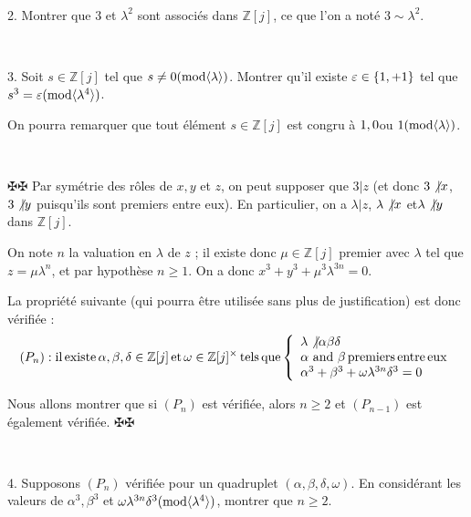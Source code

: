 \

2. Montrer que $3$ et $\lambda^2$ sont associ{\'e}s dans $\mathbb{Z}[j]$, ce
que l'on a not{\'e} $3 \sim \lambda^2$.

\

3. Soit $s \in \mathbb{Z}[j]$ tel que $s \neq 0 (\tmop{mod} \langle \lambda
\rangle)$. Montrer qu'il existe $\varepsilon \in \{\nonconverted{minus} 1, +
1\}$ tel que $s^3 = \varepsilon (\tmop{mod} \langle \lambda^4 \rangle)$.

{} On pourra remarquer que tout
{\'e}l{\'e}ment $s \in \mathbb{Z}[j]$ est congru {\`a} $\nonconverted{minus}
1, 0$ou $1 (\tmop{mod} \langle \lambda \rangle)$.

\

$\maltese \maltese$ Par sym{\'e}trie des r{\^o}les de $x, y$ et $z$, on peut
supposer que $3 | z$ (et donc $3 \not{| \nobracket} x$, $3 \not{| \nobracket}
y$ puisqu'ils sont premiers entre eux). En particulier, on a $\lambda | z$,
$\lambda \not{| \nobracket} x$ et$\lambda \not{| \nobracket} y$ dans
$\mathbb{Z}[j]$.

On note $n$ la valuation en $\lambda$ de $z$ ; il existe donc $\mu \in
\mathbb{Z}[j]$ premier avec $\lambda$ tel que $z = \mu \lambda^n$, et par
hypoth{\`e}se $n \geqslant 1.$ On a donc $x^3 + y^3 + \mu^3 \lambda^{3 n} =
0.$

La propri{\'e}t{\'e} suivante (qui pourra {\^e}tre utilis{\'e}e sans plus de
justification) est donc v{\'e}rifi{\'e}e :
\[ (P_n) : \tmop{il} \tmop{existe} \alpha, \beta, \delta \in \mathbb{Z}[j]
   \tmop{et} \omega \in \mathbb{Z}[j]^{\times} \tmop{tels} \tmop{que}
   \left\{\begin{array}{l}
     \lambda \not{| \nobracket} \alpha \beta \delta\\
     \alpha \infixand \beta \tmop{premiers} \tmop{entre} \tmop{eux}\\
     \alpha^3 + \beta^3 + \omega \lambda^{3 n} \delta^3 = 0
   \end{array}\right. \]


Nous allons montrer que si $(P_n)$ est v{\'e}rifi{\'e}e, alors $n \geqslant
2$ et $(P_{n - 1})$ est {\'e}galement v{\'e}rifi{\'e}e. $\maltese \maltese$

\

4. Supposons $(P_n)$ v{\'e}rifi{\'e}e pour un quadruplet $(\alpha, \beta,
\delta, \omega)$. En consid{\'e}rant les valeurs de $\alpha^3, \beta^3$ et
$\omega \lambda^{3 n} \delta^3 (\tmop{mod} \langle \lambda^4 \rangle)$,
montrer que $n \geqslant 2$.

